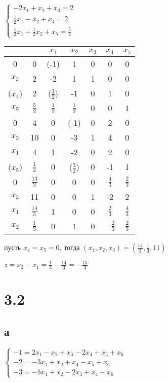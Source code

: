 \documentclass[russian]{article}
\begin{document}
$\begin{cases}
-2 x_1 + x_2 + x_3 = 2 \\
\frac{1}{2}x_1 - x_2 + x_4 = 2 \\
\frac{1}{2}x_1 + \frac{1}{2}x_2 + x_5 = \frac{5}{2}
\end{cases}$


\begin{tabular}{|c|c|ccccc|}\hline
& & $x_1$ & $x_2$ & $x_3$ & $x_4$ & $x_5$ \\\hline

0 & 0 & (-1) & 1 & 0 & 0 & 0 \\
$x_3$ & 2 & -2 & 1 & 1 & 0 & 0 \\
($x_4$) & 2 & ($\frac{1}{2}$) & -1 & 0 & 1 & 0 \\
$x_5$ & $\frac{5}{2}$ & $\frac{1}{2}$ & $\frac{1}{2}$ & 0 & 0 & 1 \\\hline

0 & 4 & 0 & (-1) & 0 & 2 & 0 \\
$x_3$ & 10 & 0 & -3 & 1 & 4 & 0 \\
$x_1$ & 4 & 1 & -2 & 0 & 2 & 0 \\
($x_5$) & $\frac{1}{2}$ & 0 & ($\frac{3}{2}$) & 0 & -1 & 1 \\\hline

0 & $\frac{13}{3}$ & 0 & 0 & 0 & $\frac{4}{3}$ & $\frac{2}{3}$ \\
$x_3$ & 11 & 0 & 0 & 1 & -2 & 2 \\
$x_1$ & $\frac{14}{3}$ & 1 & 0 & 0 & $\frac{2}{3}$ & $\frac{4}{3}$ \\
$x_2$ & $\frac{1}{3}$ & 0 & 1 & 0 & $-\frac{2}{3}$ & $\frac{2}{3}$ \\\hline

\end{tabular}

пусть $x_4 = x_5 = 0$, тогда $(x_1, x_2, x_3) = (\frac{14}{3}, \frac{1}{3}, 11)$

$z = x_2 - x_1 = \frac{1}{3} - \frac{14}{3} = -\frac{13}{3}$

\section*{3.2}

\subsection*{а}

$\begin{cases}
-1 = 2 x_1 - x_2 + x_3 - 2 x_4 + x_5 + x_6 \\
-2 = -3 x_1 + x_2 + x_4 - x_5 + x_6 \\
-3 = - 5 x_1 + x_2 - 2 x_3 + x_4 - x_6
\end{cases}$
\end{document}
